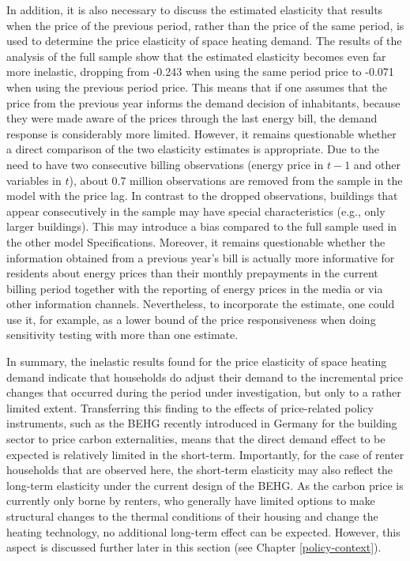 \documentclass[12pt,twoside]{reedthesis}
\begin{document}
In addition, it is also necessary to discuss the estimated elasticity that results when the price of the previous period, rather than the price of the same period, is used to determine the price elasticity of space heating demand. The results of the analysis of the full sample show that the estimated elasticity becomes even far more inelastic, dropping from -0.243 when using the same period price to -0.071 when using the previous period price. This means that if one assumes that the price from the previous year informs the demand decision of inhabitants, because they were made aware of the prices through the last energy bill, the demand response is considerably more limited. However, it remains questionable whether a direct comparison of the two elasticity estimates is appropriate. Due to the need to have two consecutive billing observations (energy price in \(t-1\) and other variables in \(t\)), about 0.7 million observations are removed from the sample in the model with the price lag. In contrast to the dropped observations, buildings that appear consecutively in the sample may have special characteristics (e.g., only larger buildings). This may introduce a bias compared to the full sample used in the other model Specifications. Moreover, it remains questionable whether the information obtained from a previous year's bill is actually more informative for residents about energy prices than their monthly prepayments in the current billing period together with the reporting of energy prices in the media or via other information channels. Nevertheless, to incorporate the estimate, one could use it, for example, as a lower bound of the price responsiveness when doing sensitivity testing with more than one estimate.

In summary, the inelastic results found for the price elasticity of space heating demand indicate that households do adjust their demand to the incremental price changes that occurred during the period under investigation, but only to a rather limited extent. Transferring this finding to the effects of price-related policy instruments, such as the BEHG recently introduced in Germany for the building sector to price carbon externalities, means that the direct demand effect to be expected is relatively limited in the short-term. Importantly, for the case of renter households that are observed here, the short-term elasticity may also reflect the long-term elasticity under the current design of the BEHG. As the carbon price is currently only borne by renters, who generally have limited options to make structural changes to the thermal conditions of their housing and change the heating technology, no additional long-term effect can be expected. However, this aspect is discussed further later in this section (see Chapter \ref{policy-context}).
\end{document}
